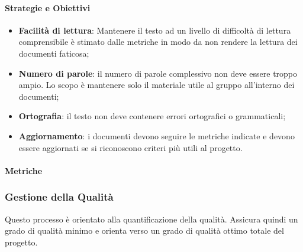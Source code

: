            \paragraph{Strategie e Obiettivi}
            \begin{itemize}
                \item \textbf{Facilità di lettura}: Mantenere il testo ad un livello di difficoltà di lettura comprensibile è stimato dalle metriche in modo da non rendere la lettura dei documenti faticosa;
                \item \textbf{Numero di parole}: il numero di parole complessivo non deve essere troppo ampio. Lo scopo è mantenere solo il materiale utile al gruppo all'interno dei documenti;
                \item \textbf{Ortografia}: il testo non deve contenere errori ortografici o grammaticali;
                \item \textbf{Aggiornamento}: i documenti devono seguire le metriche indicate e devono essere aggiornati se si riconoscono criteri più utili al progetto.
            \end{itemize}
    \newpage
            \paragraph{Metriche}
            
            \hphantom{}
         \def\productquality{
                           {   Gulpease index,
                                $89 + (300*Frasi - 10*\frac{Lettere}{Parole}$, 
                                $40 < IG \leq 100$,
                                $80 < IG \leq 100$
                            },
                            {   Correttezza ortografica,
                                numero totale di errori, 
                                0,
                                0
                            },
                        }
                    
                    
                    
            \subsubsection{Gestione della Qualità}
            Questo processo è orientato alla quantificazione della qualità. Assicura quindi un grado di qualità minimo e orienta verso un grado di qualità ottimo totale del progetto.
            
